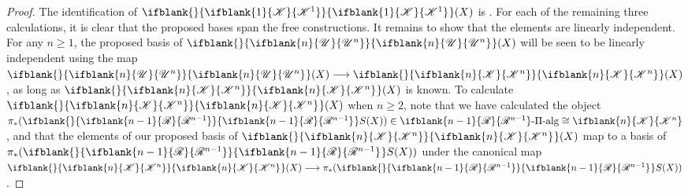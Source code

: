 \documentclass[10pt]{article}
\newcommand{\GS}[1]{\scrE^{#1}}
\newcommand{\RestLie}[1]%
{\ifblank{#1}{\mathsf{r}{\scrL}}{\mathsf{r}{\scrL}^{#1}}}
\newcommand{\GoodLie}[1]%
{\ifblank{#1}{\mathsf{g}{\scrL}}{\mathsf{g}{\scrL}^{#1}}}
\newcommand{\PRLie}[1]%
{\ifblank{#1}{\scrR}{\scrR^{#1}}}
\newcommand{\LL}[1]{\ifblank{#1}{\scrK}{\scrK^{#1}}}
\newcommand{\GR}[1]{\ifblank{#1}{\scrV}{\scrV^{#1}}}
\newcommand{\nontop}[1]{\ifblank{#1}{\scrU}{\scrU^{#1}}}
\newcommand{\PiAlg}[1]{#1\textup{-$\Pi$-alg}}
\newcommand{\admis}[1]{\mathrm{adm}(#1)}%
\newcommand{\Fr}[2][]{\ifblank{#1}{#2}{#2_{#1}}}
\renewcommand{\Q}{Q}
\begin{document}
\begin{CategoriesOfInterest}
%
\begin{proof}
The identification of $\Fr{\LL{1}}(X)$ is \cite[Thm F, p.15]{MR1089001}.
For each of the remaining three calculations, it is clear that the proposed bases span the free constructions. It remains to show that the elements are linearly independent.
For any $n\geq1$, the proposed basis of $\Fr{\nontop{n}}(X)$ will be seen to be linearly independent using the map $\Fr{\nontop{n}}(X)\to \Fr{\LL{n}}(X)$, as long as $\Fr{\LL{n}}(X)$ is known. To calculate $\Fr{\LL{n}}(X)$ when $n\geq2$, note that we have calculated the object $\pi_*(\Fr{\PRLie{n-1}}S(X))\in\PiAlg{\PRLie{n-1}}\cong\LL{n}$, and that the elements of our proposed basis of $\Fr{\LL{n}}(X)$ map to a basis of $\pi_*(\Fr{\PRLie{n-1}}S(X))$ under the canonical map $\Fr{\LL{n}}(X)\to \pi_*(\Fr{\PRLie{n-1}}S(X))$. %

\end{proof}
\end{CategoriesOfInterest}
\end{document}
